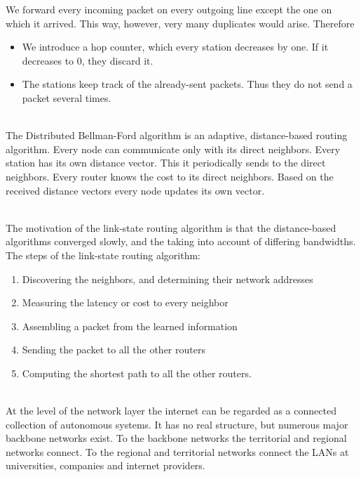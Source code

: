 \documentclass[margin=0px]{article}
\begin{document}
\begin{description}
\begin{description}
                We forward every incoming packet on every outgoing line except the one on which it arrived. This way, however, very many duplicates would arise. Therefore
                \begin{itemize}
                    \item We introduce a hop counter, which every station decreases by one. If it decreases to 0, they discard it.
                    \item The stations keep track of the already-sent packets. Thus they do not send a packet several times.
                \end{itemize}
            \item[Distributed Bellman-Ford algorithm] \hfill \\
                The Distributed Bellman-Ford algorithm is an adaptive, distance-based routing algorithm. Every node can communicate only with its direct neighbors. Every station has its own distance vector. This it periodically sends to the direct neighbors. Every router knows the cost to its direct neighbors. Based on the received distance vectors every node updates its own vector.
            \item[Link-state routing] \hfill \\
                The motivation of the link-state routing algorithm is that the distance-based algorithms converged slowly, and the taking into account of differing bandwidths. \\
                The steps of the link-state routing algorithm:
                \begin{enumerate}
                    \item Discovering the neighbors, and determining their network addresses
                    \item Measuring the latency or cost to every neighbor
                    \item Assembling a packet from the learned information
                    \item Sending the packet to all the other routers
                    \item Computing the shortest path to all the other routers.
                \end{enumerate}
        \end{description}
    \item[Network layer on the Internet] \hfill \\
        At the level of the network layer the internet can be regarded as a connected collection of autonomous systems. It has no real structure, but numerous major backbone networks exist. To the backbone networks the territorial and regional networks connect. To the regional and territorial networks connect the LANs at universities, companies and internet providers.


\end{description}
\end{document}
